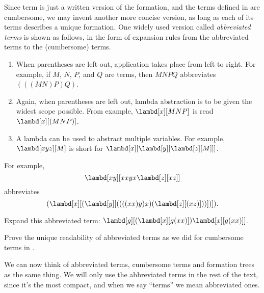 \documentclass[../../../include/open-logic-section]{subfiles}
\begin{document}

Since term is just a written version of the formation, and the terms
defined in  are cumbersome, we may invent another more concise version, as
long as each of its terms describes a unique formation. One
widely used version called \emph{abbreviated terms} is shown as
follows, in the form of expansion rules from the abbreviated terms to the (cumbersome) terms.

\begin{enumerate}
\item When parentheses are left out, application takes place from left
  to right. For example, if $M$, $N$, $P$, and $Q$ are terms, then
  $MNPQ$ abbreviates $(((MN)P)Q)$.
\item Again, when parentheses are left out, lambda abstraction is to
  be given the widest scope possible. From example, $\lambd[x][MNP]$ is
  read $\lambd[x][(MNP)]$.
\item A lambda can be used to abstract multiple variables. For
  example, $\lambd[xyz][M]$ is short for
  $\lambd[x][\lambd[y][\lambd[z][M]]]$.
\end{enumerate}

For example,
\[
\lambd[xy][xxyx \lambd[z][xz]]
\]
abbreviates
\[
(\lambd[x][(\lambd[y][((((xx)y)x)(\lambd[z][(xz)]))])]).
\]

\begin{prob}
  Expand this abbreviated term: $\lambd[g][(\lambd[x][g (x x)]) \lambd[x][g (x x)]]$.
\end{prob}

\begin{prob}
  Prove the unique readability of abbreviated terms as we did for
  cumbersome terms in .
\end{prob}

We can now think of abbreviated terms, cumbersome terms and
formation trees as the same
thing. We will only use the abbreviated terms in the rest of the
text, since it's the most compact, and when we say ``terms'' we mean
abbreviated ones.
\end{document}
